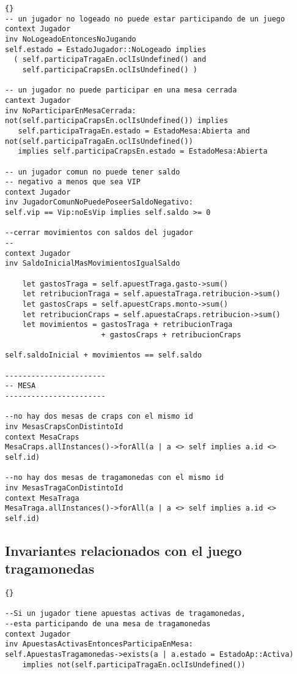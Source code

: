 \begin{framed}
\begin{lstlisting}[frame=trbl]{}
-- un jugador no logeado no puede estar participando de un juego
context Jugador
inv NoLogeadoEntoncesNoJugando
self.estado = EstadoJugador::NoLogeado implies 
  ( self.participaTragaEn.oclIsUndefined() and 
    self.participaCrapsEn.oclIsUndefined() )

-- un jugador no puede participar en una mesa cerrada
cantext Jugador
inv NoParticiparEnMesaCerrada:
not(self.participaCrapsEn.oclIsUndefined()) implies 
   self.participaTragaEn.estado = EstadoMesa:Abierta and
not(self.participaTragaEn.oclIsUndefined()) 
   implies self.participaCrapsEn.estado = EstadoMesa:Abierta
      
-- un jugador comun no puede tener saldo 
-- negativo a menos que sea VIP
context Jugador
inv JugadorComunNoPuedePoseerSaldoNegativo:
self.vip == Vip:noEsVip implies self.saldo >= 0

--cerrar movimientos con saldos del jugador
--
context Jugador
inv SaldoInicialMasMovimientosIgualSaldo

    let gastosTraga = self.apuestTraga.gasto->sum()
    let retribucionTraga = self.apuestaTraga.retribucion->sum()
    let gastosCraps = self.apuestCraps.monto->sum()
    let retribucionCraps = self.apuestaCraps.retribucion->sum()
    let movimientos = gastosTraga + retribucionTraga
                      + gastosCraps + retribucionCraps
    
self.saldoInicial + movimientos == self.saldo

-----------------------
-- MESA
-----------------------

--no hay dos mesas de craps con el mismo id
inv MesasCrapsConDistintoId
context MesaCraps
MesaCraps.allInstances()->forAll(a | a <> self implies a.id <> self.id)

--no hay dos mesas de tragamonedas con el mismo id
inv MesasTragaConDistintoId
context MesaTraga
MesaTraga.allInstances()->forAll(a | a <> self implies a.id <> self.id)

\end{lstlisting}

\subsection{Invariantes relacionados con el juego tragamonedas}
\lstset{language=ocl}
\lstset{commentstyle=\textit}
\begin{lstlisting}[frame=trbl]{}

--Si un jugador tiene apuestas activas de tragamonedas,
--esta participando de una mesa de tragamonedas
context Jugador
inv ApuestasActivasEntoncesParticipaEnMesa:
self.ApuestasTragamonedas->exists(a | a.estado = EstadoAp::Activa)
    implies not(self.participaTragaEn.oclIsUndefined())


\end{lstlisting}
\end{framed}
